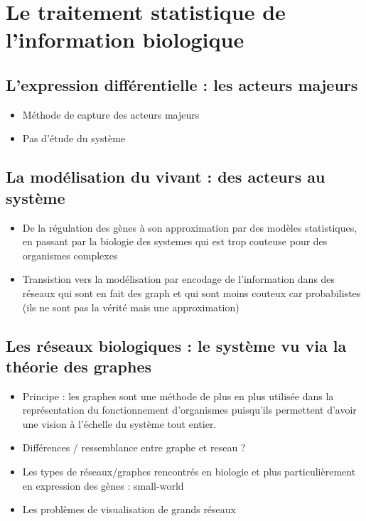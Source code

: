 

\section{Le traitement statistique de l'information biologique}
\subsection{L'expression différentielle : les acteurs majeurs}
\begin{itemize}
  \item Méthode de capture des acteurs majeurs
  \item Pas d'étude du système 
\end{itemize}

\subsection{La modélisation du vivant : des acteurs au système}
\begin{itemize}
\item De la régulation des gènes à son approximation par des modèles statistiques, en passant par la biologie des systemes qui est trop couteuse pour des organismes complexes %
\item Transistion vers la modélisation par encodage de l'information dans des réseaux qui sont en fait des graph et qui sont moins couteux car probabilistes (ils ne sont pas la vérité mais une approximation)
\end{itemize}

\subsection{Les réseaux biologiques : le système vu via la théorie des graphes}
\begin{itemize}
\item Principe : les graphes sont une méthode de plus en plus utilisée dans la représentation du fonctionnement d'organismes puisqu'ils permettent d'avoir une vision à l'échelle du système tout entier.
\item Différences / ressemblance entre graphe et reseau ?
\item Les types de réseaux/graphes rencontrés en biologie et plus particulièrement en expression des gènes : small-world
\item Les problèmes de visualisation de grands réseaux %
\end{itemize}


